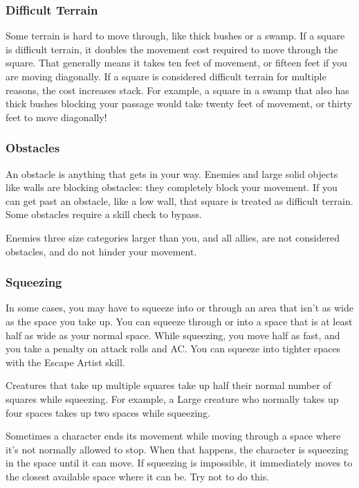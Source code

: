 \subsubsection{Difficult Terrain}
Some terrain is hard to move through, like thick bushes or a swamp. If a square is difficult terrain, it doubles the movement cost required to move through the square. That generally means it takes ten feet of movement, or fifteen feet if you are moving diagonally. If a square is considered difficult terrain for multiple reasons, the cost increases stack. For example, a square in a swamp that also has thick bushes blocking your passage would take twenty feet of movement, or thirty feet to move diagonally!

\subsubsection{Obstacles}
An obstacle is anything that gets in your way. Enemies and large solid objects like walls are blocking obstacles: they completely block your movement. If you can get past an obstacle, like a low wall, that square is treated as difficult terrain. Some obstacles require a skill check to bypass.

Enemies three size categories larger than you, and all allies, are not considered obstacles, and do not hinder your movement.

\subsubsection{Squeezing}

In some cases, you may have to squeeze into or through an area that isn't as wide as the space you take up. You can squeeze through or into a space that is at least half as wide as your normal space. While squeezing, you move half as fast, and you take a  penalty on attack rolls and AC. You can squeeze into tighter spaces with the Escape Artist skill.

Creatures that take up multiple squares take up half their normal number of squares while squeezing. For example, a Large creature who normally takes up four spaces takes up two spaces while squeezing.

 Sometimes a character ends its movement while moving through a space where it's not normally allowed to stop. When that happens, the character is squeezing in the space until it can move. If squeezing is impossible, it immediately moves to the closest available space where it can be. Try not to do this.

